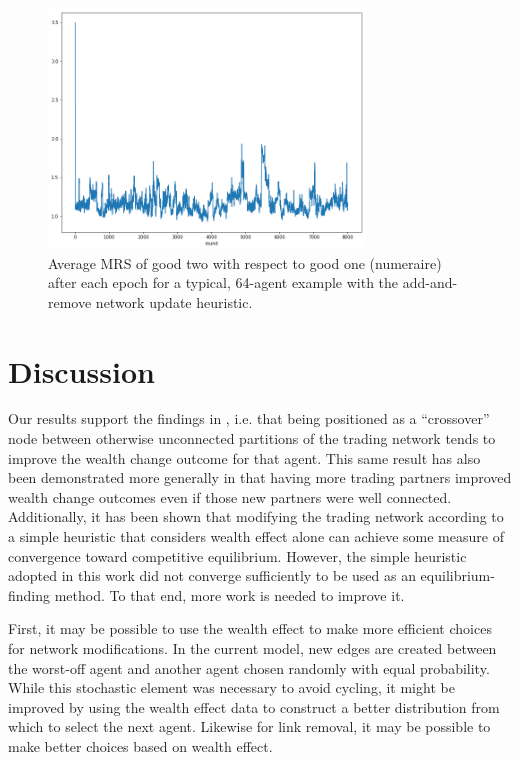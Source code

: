\documentclass[smallextended]{svjour3}
\begin{document}
\begin{figure}
  \includegraphics[width=0.75\textwidth]{h2allpriceave.png}
  \caption{Average MRS of good two with respect to good one (numeraire) after
    each epoch for a typical, 64-agent example with the add-and-remove network update heuristic. }
  \label{h2allpriceave}
\end{figure}

\section{Discussion}
Our results support the findings in \cite {wilhite2001bilateral}, i.e. that being positioned as a ``crossover'' node between otherwise
unconnected partitions of the trading network tends to improve the wealth change
outcome for that agent.
This same result has also been demonstrated more generally in that having more trading partners improved wealth change outcomes even if those new partners were well connected.
Additionally, it has been shown that modifying the trading network according to a
simple heuristic that considers wealth effect alone can achieve some measure of
convergence toward competitive equilibrium.
However, the simple heuristic adopted in this work did not converge
sufficiently to be used as an equilibrium-finding method. To that end, more work is needed to improve it.

First, it may be possible to use the wealth effect to make more efficient
choices for network modifications.
In the current model, new edges are created between the worst-off agent and
another agent chosen randomly with equal probability.
While this stochastic element was necessary to avoid cycling, it might be
improved by using the wealth effect data to construct a better distribution
from which to select the next agent.
Likewise for link removal, it may be possible to make better choices based on
wealth effect.
\end{document}

